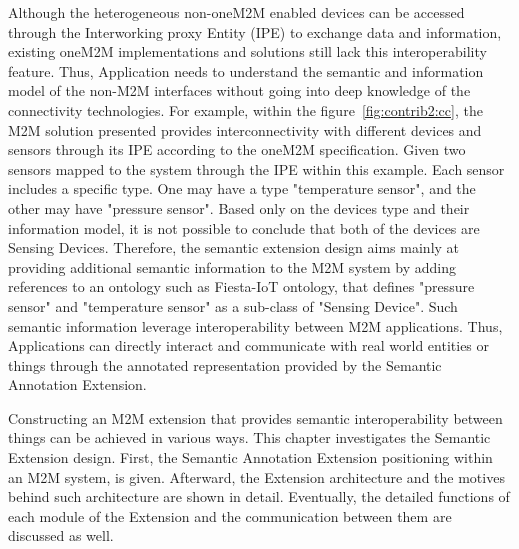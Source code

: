 Although the heterogeneous non-oneM2M enabled devices can be accessed through the Interworking proxy Entity (IPE) to exchange data and information, existing oneM2M implementations and solutions still lack this interoperability feature. Thus, Application needs to understand the semantic and information model of the non-M2M interfaces without going into deep knowledge of the connectivity technologies. For example, within the figure~\ref{fig:contrib2:cc}, the M2M solution presented provides interconnectivity with different devices and sensors through its IPE according to the oneM2M specification. Given two sensors mapped to the system through the IPE within this example. Each sensor includes a specific type. One may have a type "temperature sensor", and the other may have "pressure sensor". Based only on the devices type and their information model, it is not possible to conclude that both of the devices are Sensing Devices. Therefore, the semantic extension design aims mainly at providing additional semantic information to the M2M system by adding references to an ontology such as Fiesta-IoT ontology, that defines "pressure sensor" and "temperature sensor" as a sub-class of "Sensing Device". Such semantic information leverage interoperability between M2M applications. Thus, Applications can directly interact and communicate with real world entities or things through the annotated representation provided by the Semantic Annotation Extension.\par
Constructing an M2M extension that provides semantic interoperability between things can be achieved in various ways. This chapter investigates the Semantic Extension design. First, the Semantic Annotation Extension positioning within an M2M system, is given. Afterward, the Extension architecture and the motives behind such architecture are shown in detail. Eventually, the detailed functions of each module of the Extension and the communication between them are discussed as well.

